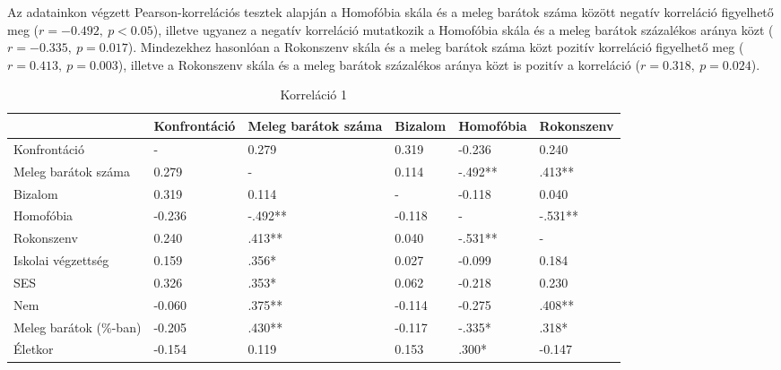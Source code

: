 Az adatainkon végzett Pearson-korrelációs tesztek alapján a Homofóbia skála és a meleg barátok száma között negatív korreláció figyelhető meg ($r= -0.492, \  p<0.05$), illetve ugyanez a negatív korreláció mutatkozik a Homofóbia skála és a meleg barátok százalékos aránya közt ($r= -0.335, \  p=0.017$). Mindezekhez hasonlóan a Rokonszenv skála és a meleg barátok száma közt pozitív korreláció figyelhető meg ($r= 0.413, \  p=0.003$), illetve a Rokonszenv skála és a meleg barátok százalékos aránya közt is pozitív a korreláció ($r=0.318, \  p=0.024$). 


\begin{table}[h]
	\small
	\begin{tabular}{@{}lp{2cm}p{2cm}lp{2cm}l@{}}
		\toprule
		& Konfrontáció & Meleg barátok száma & Bizalom & Homofóbia & Rokonszenv \\ \midrule
		Konfrontáció            & -            & 0.279               & 0.319   & -0.236    & 0.240      \\
		Meleg barátok száma     & 0.279        & -                   & 0.114   & -.492**   & .413**     \\
		Bizalom                 & 0.319        & 0.114               & -       & -0.118    & 0.040      \\
		Homofóbia               & -0.236       & -.492**             & -0.118  & -         & -.531**    \\
		Rokonszenv              & 0.240        & .413**              & 0.040   & -.531**   & -          \\
		Iskolai végzettség      & 0.159        & .356*               & 0.027   & -0.099    & 0.184      \\
		SES & 0.326        & .353*               & 0.062   & -0.218    & 0.230      \\
		Nem                     & -0.060       & .375**              & -0.114  & -0.275    & .408**     \\
		Meleg barátok (\%-ban)  & -0.205       & .430**              & -0.117  & -.335*    & .318*      \\
		Életkor                 & -0.154       & 0.119               & 0.153   & .300*     & -0.147    
	\end{tabular}
	\caption{Korreláció  1}
	\label{table:2}
\end{table}


